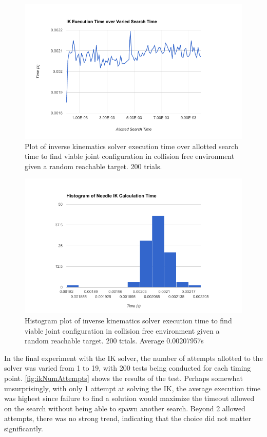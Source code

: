\documentclass[12pt]{report}
\begin{document}
\begin{figure}[thpb]
	\centering
	\includegraphics[width = 5in]{graphs/ik_exec_time_over_allowed.png}
    \caption{Plot of inverse kinematics solver execution time over allotted search time to find viable joint configuration in collision free environment given a random reachable target. 200 trials.}
    \label{fig:ikexeTime}
\end{figure}

\begin{figure}[thpb]
	\centering
	\includegraphics[width = 5in]{graphs/ik_hist_1_attempt.png}
    \caption{Histogram plot of inverse kinematics solver execution time to find viable joint configuration in collision free environment given a random reachable target. 200 trials. Average 0.00207957s}
    \label{fig:ikHist}
\end{figure}

In the final experiment with the IK solver, the number of attempts allotted to the solver was varied from 1 to 19, with 200 tests being conducted for each timing point. \autoref{fig:ikNumAttempts} shows the results of the test. Perhaps somewhat unsurprisingly, with only 1 attempt at solving the IK, the average execution time was highest since failure to find a solution would maximize the timeout allowed on the search without being able to spawn another search. Beyond 2 allowed attempts, there was no strong trend, indicating that the choice did not matter significantly.
\end{document}
